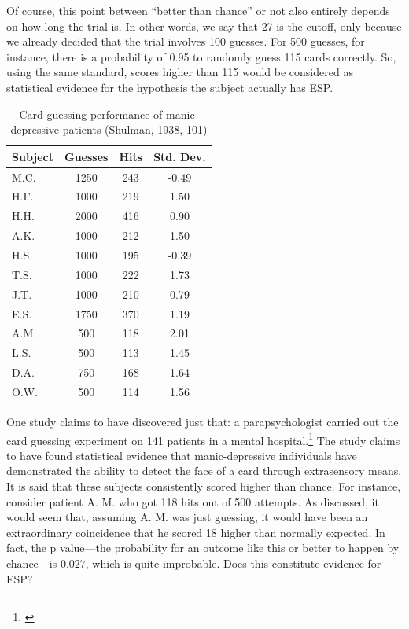 Of course, this point between ``better than chance'' or not also entirely depends on how long the trial
is. In other words, we say that 27 is the cutoff, only because we
already decided that the trial involves 100 guesses. For 500 guesses,
for instance, there is a probability of 0.95 to randomly guess 115 cards
correctly. So, using the same standard, scores higher than 115 would be
considered as statistical evidence for the hypothesis the subject
actually has ESP.

\begin{table}[]
\centering
\caption{Card-guessing performance of manic-depressive patients (Shulman, 1938, 101)}
\label{psychotable}
\begin{tabular}{l|c|c|c}
 Subject& Guesses &Hits  & Std. Dev. \\\hline
 M.C.& 1250 & 243 &  -0.49\\
H.F. &1000  & 219 & 1.50 \\
H.H. & 2000 & 416 & 0.90 \\
A.K. & 1000 & 212 & 1.50 \\
 H.S.& 1000 & 195 & -0.39 \\
 T.S. & 1000 & 222 & 1.73 \\
 J.T.& 1000 & 210 & 0.79 \\
 E.S.& 1750 & 370 & 1.19 \\
 A.M.& 500 & 118 & 2.01 \\
 L.S.& 500 & 113 & 1.45 \\
 D.A.& 750 & 168 &  1.64\\
 O.W.& 500 & 114 &  1.56
\end{tabular}

\end{table}

One study claims to have discovered just that: a parapsychologist
carried out the card guessing experiment on 141 patients in a mental
hospital.\footnote{\cite{psyesp}} The study claims to have found statistical evidence that
manic-depressive individuals have demonstrated the ability to detect the
face of a card through extrasensory means. It is said that these
subjects consistently scored higher than chance. For instance, consider
patient A. M. who got 118 hits out of 500 attempts. As discussed, it
would seem that, assuming A. M. was just guessing, it would have been an
extraordinary coincidence that he scored 18 higher than normally
expected. In fact, the p value---the probability for an outcome like this or
better to happen by chance---is \(0.027\), which is quite
improbable. Does this constitute evidence for ESP?

